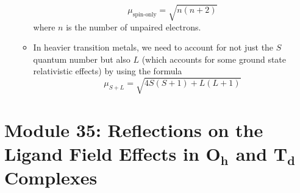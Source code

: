 \documentclass[../notes.tex]{subfiles}
\begin{document}
\begin{itemize}
\begin{itemize}
        \begin{equation*}
            \mu_\text{spin-only} = \sqrt{n(n+2)}
        \end{equation*}
        where $n$ is the number of unpaired electrons.
        \item In heavier transition metals, we need to account for not just the $S$ quantum number but also $L$ (which accounts for some ground state relativistic effects) by using the formula
        \begin{equation*}
            \mu_{S+L} = \sqrt{4S(S+1)+L(L+1)}
        \end{equation*}
    \end{itemize}
\end{itemize}



\section[Module 35: Reflections on the Ligand Field Effects in \texorpdfstring{$O_h$}{TEXT} and \texorpdfstring{$T_d$}{TEXT} Complexes]{Module 35: Reflections on the Ligand Field Effects in \texorpdfstring{$\bm{O_h}$}{TEXT} and \texorpdfstring{$\bm{T_d}$}{TEXT} Complexes}
\end{document}
